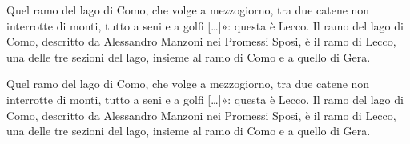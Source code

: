 \documentclass[11pt,b5paper]{book}
\begin{document}
\begin{pairs}
	\begin{Leftside}
		\beginnumbering
		\pstart
		Quel ramo del lago di Como, che volge a mezzogiorno, tra due catene non interrotte di monti, tutto a seni e a golfi […]»: questa è Lecco. Il ramo del lago di Como, descritto da Alessandro Manzoni nei Promessi Sposi, è il ramo di Lecco, una delle tre sezioni del lago, insieme al ramo di Como e a quello di Gera.
		\pend
	\end{Leftside}

	\begin{Rightside}
		\beginnumbering
		\pstart
		Quel ramo del lago di Como, che volge a mezzogiorno, tra due catene non interrotte di monti, tutto a seni e a golfi […]»: questa è Lecco. Il ramo del lago di Como, descritto da Alessandro Manzoni nei Promessi Sposi, è il ramo di Lecco, una delle tre sezioni del lago, insieme al ramo di Como e a quello di Gera.
		\pend
		\endnumbering
	\end{Rightside}
\end{pairs}
\Columns
\end{document}
